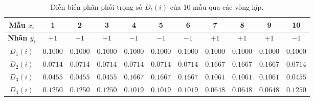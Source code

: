 \documentclass[11pt, a4paper]{article}
\begin{document}
\begin{table}[h!]
\centering
\renewcommand{\arraystretch}{1.25}
\begin{tabular}{@{}ccccccccccc@{}}
\toprule
\textbf{Mẫu $x_i$} & \textbf{1} & \textbf{2} & \textbf{3} & \textbf{4} & \textbf{5} & \textbf{6} & \textbf{7} & \textbf{8} & \textbf{9} & \textbf{10} \\
\midrule
\textbf{Nhãn $y_i$} & $+1$ & $+1$ & $+1$ & $-1$ & $-1$ & $-1$ & $+1$ & $+1$ & $+1$ & $-1$ \\
\midrule
$D_1(i)$ & $0.1000$ & $0.1000$ & $0.1000$ & $0.1000$ & $0.1000$ & $0.1000$ & $0.1000$ & $0.1000$ & $0.1000$ & $0.1000$ \\
$D_2(i)$ & $0.0714$ & $0.0714$ & $0.0714$ & $0.0714$ & $0.0714$ & $0.0714$ & $0.1667$ & $0.1667$ & $0.1667$ & $0.0714$ \\
$D_3(i)$ & $0.0455$ & $0.0455$ & $0.0455$ & $0.1667$ & $0.1667$ & $0.1667$ & $0.1061$ & $0.1061$ & $0.1061$ & $0.0455$ \\
$D_4(i)$ & $0.1250$ & $0.1250$ & $0.1250$ & $0.1019$ & $0.1019$ & $0.1019$ & $0.0648$ & $0.0648$ & $0.0648$ & $0.1250$ \\
\bottomrule
\end{tabular}
\caption{Diễn biến phân phối trọng số $D_t(i)$ của 10 mẫu qua các vòng lặp.}
\end{table}
\end{document}
